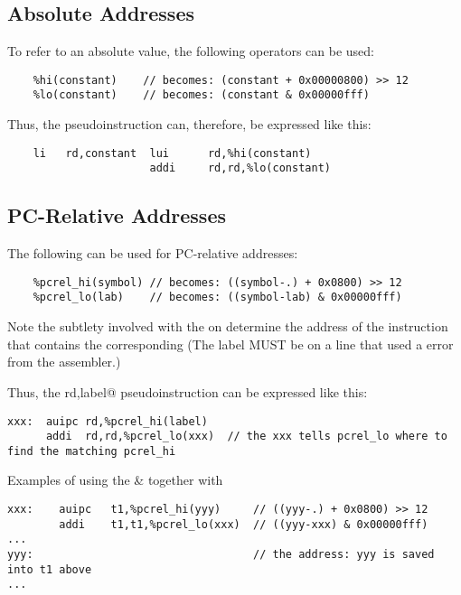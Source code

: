 \subsection{Absolute Addresses}

To refer to an absolute value, the following operators can be used:
{\small
\begin{verbatim}
    %hi(constant)    // becomes: (constant + 0x00000800) >> 12
    %lo(constant)    // becomes: (constant & 0x00000fff)
\end{verbatim}
}

Thus, the \verb@li@ pseudoinstruction can, therefore, be expressed like this:

{\small
\begin{verbatim}
    li   rd,constant  lui      rd,%hi(constant)
                      addi     rd,rd,%lo(constant)
\end{verbatim}
}



\subsection{PC-Relative Addresses}

The following can be used for PC-relative addresses:
{\small
\begin{verbatim}
    %pcrel_hi(symbol) // becomes: ((symbol-.) + 0x0800) >> 12
    %pcrel_lo(lab)    // becomes: ((symbol-lab) & 0x00000fff)
\end{verbatim}
}

Note the subtlety involved with the \verb@lab@ on \verb@%pcrel_lo@. It is needed to 
determine the address of the instruction that contains the corresponding \verb@%pcrel_hi@.
(The label \verb@lab@ MUST be on a line that used a \verb@%pcrel_hi()@ or get an 
error from the assembler.)

Thus, the \verb@la rd,label@ pseudoinstruction can be expressed like this:
{\small
\begin{verbatim}
xxx:  auipc rd,%pcrel_hi(label)
      addi  rd,rd,%pcrel_lo(xxx)  // the xxx tells pcrel_lo where to find the matching pcrel_hi
\end{verbatim}
}

Examples of using the \verb@auipc@ \& \verb@addi@ together with \verb@%pcrel_hi()@ and
\verb@%pcrel_lo()@:

{\small
\begin{verbatim}
xxx:    auipc   t1,%pcrel_hi(yyy)     // ((yyy-.) + 0x0800) >> 12
        addi    t1,t1,%pcrel_lo(xxx)  // ((yyy-xxx) & 0x00000fff)
...
yyy:                                  // the address: yyy is saved into t1 above
...
\end{verbatim}
}



